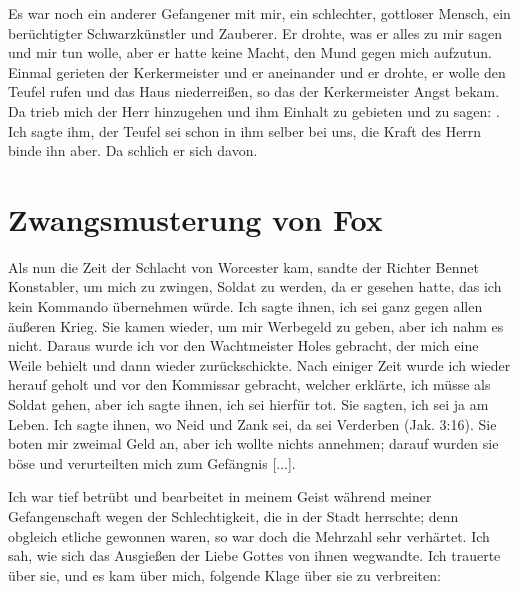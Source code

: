 Es war noch ein anderer Gefangener mit mir, ein schlechter,
gottloser Mensch, ein berüchtigter Schwarzkünstler 
und Zauberer.
Er drohte, was er alles zu mir sagen und mir tun wolle, aber
er hatte keine Macht, den Mund gegen mich aufzutun. Einmal
gerieten der Kerkermeister und er aneinander und er drohte, er
wolle den Teufel rufen und das Haus niederreißen, so das der
Kerkermeister Angst bekam. Da trieb mich der Herr hinzugehen
und ihm Einhalt zu gebieten und zu sagen: . Ich sagte ihm, der Teufel
sei schon in ihm selber bei uns, die Kraft des Herrn binde ihn
aber. Da schlich er sich davon.

\section{Zwangsmusterung von Fox}

Als nun die Zeit der Schlacht von Worcester kam, sandte
der Richter Bennet Konstabler, um mich zu zwingen, Soldat zu
werden, da er gesehen hatte, das ich kein Kommando übernehmen
würde. Ich sagte ihnen, ich sei ganz gegen allen 
äußeren Krieg.
Sie kamen wieder, um mir Werbegeld zu geben, aber ich nahm
es nicht. Daraus wurde ich vor den 
Wachtmeister Holes gebracht,
der mich eine Weile behielt und dann wieder zurückschickte. Nach
einiger Zeit wurde ich wieder herauf geholt und vor den Kommissar
gebracht, welcher erklärte, ich müsse als Soldat gehen, aber ich
sagte ihnen, ich sei hierfür tot. Sie sagten, ich sei ja am Leben.
Ich sagte ihnen, wo Neid und Zank sei, da sei Verderben 
(Jak. 3:16).
Sie boten mir zweimal Geld an, aber ich wollte nichts 
annehmen; darauf wurden sie böse und verurteilten mich zum 
Gefängnis [...].

\par

Ich war tief betrübt und bearbeitet in meinem Geist während
meiner Gefangenschaft wegen der Schlechtigkeit, die in der Stadt
herrschte; denn obgleich etliche gewonnen waren, so war doch die
Mehrzahl sehr verhärtet. Ich sah, wie sich das Ausgießen der
Liebe Gottes von ihnen wegwandte. Ich trauerte über sie, und
es kam über mich, folgende Klage über sie zu verbreiten:

